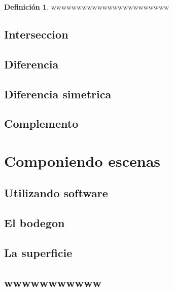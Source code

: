\documentclass[16pt,]{krantz}
\theoremstyle{definition}
\newtheorem{definition}{Definición}[chapter]
\theoremstyle{definition}
\theoremstyle{definition}
\theoremstyle{definition}
\theoremstyle{remark}
\begin{document}
\begin{definition}
\protect\hypertarget{def:unnamed-chunk-2}{}{\label{def:unnamed-chunk-2} }wwwwwwwwwwwwwwwwwwwwwww
\end{definition}

\hypertarget{interseccion}{%
\subsection{Interseccion}\label{interseccion}}

\hypertarget{diferencia}{%
\subsection{Diferencia}\label{diferencia}}

\hypertarget{diferencia-simetrica}{%
\subsection{Diferencia simetrica}\label{diferencia-simetrica}}

\hypertarget{complemento}{%
\subsection{Complemento}\label{complemento}}

\hypertarget{componiendo-escenas}{%
\section{Componiendo escenas}\label{componiendo-escenas}}

\hypertarget{utilizando-software}{%
\subsection{Utilizando software}\label{utilizando-software}}

\hypertarget{el-bodegon}{%
\subsection{El bodegon}\label{el-bodegon}}

\hypertarget{la-superficie}{%
\subsection{La superficie}\label{la-superficie}}

\hypertarget{wwwwwwwwwww}{%
\subsection{wwwwwwwwwww}\label{wwwwwwwwwww}}
\end{document}
